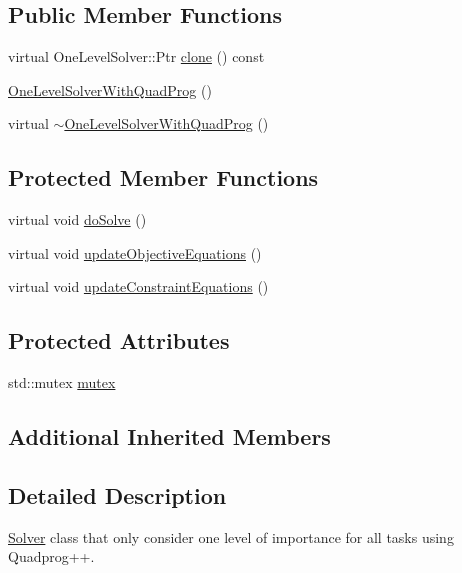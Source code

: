 \subsection*{Public Member Functions}
\begin{DoxyCompactItemize}
\item 
virtual One\+Level\+Solver\+::\+Ptr \hyperlink{classocra_1_1OneLevelSolverWithQuadProg_afc7a778574cad455a718a5af9fcbeb4c}{clone} () const 
\item 
\hyperlink{classocra_1_1OneLevelSolverWithQuadProg_a0d7f639dd36c79056c264f0c09d5be50}{One\+Level\+Solver\+With\+Quad\+Prog} ()
\item 
virtual \hyperlink{classocra_1_1OneLevelSolverWithQuadProg_a27d12b82fcaec15ca7041064bd7f9095}{$\sim$\+One\+Level\+Solver\+With\+Quad\+Prog} ()
\end{DoxyCompactItemize}
\subsection*{Protected Member Functions}
\begin{DoxyCompactItemize}
\item 
virtual void \hyperlink{classocra_1_1OneLevelSolverWithQuadProg_aa6e7517459ef68106e83a7f0dc09c977}{do\+Solve} ()
\item 
virtual void \hyperlink{classocra_1_1OneLevelSolverWithQuadProg_a3c36b4620ee75c8f6c104244350087c2}{update\+Objective\+Equations} ()
\item 
virtual void \hyperlink{classocra_1_1OneLevelSolverWithQuadProg_a0276b1005f8b5812b313aa594d01118a}{update\+Constraint\+Equations} ()
\end{DoxyCompactItemize}
\subsection*{Protected Attributes}
\begin{DoxyCompactItemize}
\item 
std\+::mutex \hyperlink{classocra_1_1OneLevelSolverWithQuadProg_a5419cdc6700e930cd48f3978ac1fe0f6}{mutex}
\end{DoxyCompactItemize}
\subsection*{Additional Inherited Members}


\subsection{Detailed Description}
\hyperlink{classocra_1_1Solver}{Solver} class that only consider one level of importance for all tasks using Quadprog++. 

